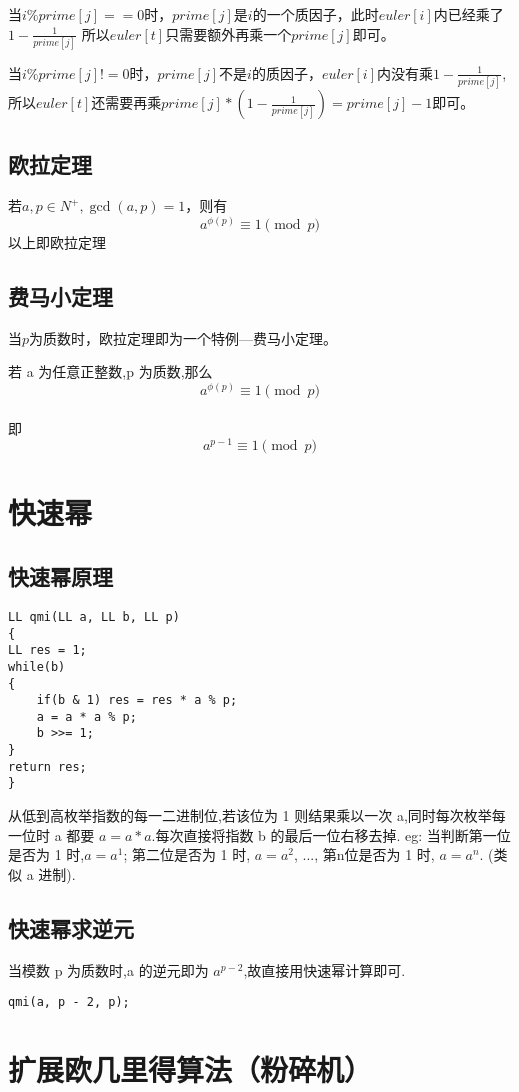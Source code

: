 \documentclass[]{book}
\begin{document}
当$i\%prime[j]==0$时，$prime[j]$是$i$的一个质因子，此时$euler[i]$内已经乘了$1-\frac{1}{prime[j]}$
所以$euler[t]$只需要额外再乘一个$prime[j]$即可。

当$i\%prime[j]!=0$时，$prime[j]$不是$i$的质因子，$euler[i]$内没有乘$1-\frac{1}{prime[j]}$,
所以$euler[t]$还需要再乘$prime[j]*(1-\frac{1}{prime[j]}) = prime[j] - 1$即可。

\section{欧拉定理}
若$a,p\in N ^+,\gcd(a, p) = 1$，则有
\[a^{\phi(p)}\equiv 1 \pmod{p}\]
以上即欧拉定理
\section{费马小定理}
当$p$为质数时，欧拉定理即为一个特例---费马小定理。

若 a 为任意正整数,p 为质数,那么
\[a^{\phi(p)}\equiv 1 \pmod{p}\]\\即
\[a^{p-1}\equiv 1 \pmod{p}\]
\chapter{快速幂}
\section{快速幂原理}
\begin{lstlisting}
LL qmi(LL a, LL b, LL p)
{
LL res = 1;
while(b)
{
    if(b & 1) res = res * a % p;
    a = a * a % p;
    b >>= 1;
}
return res;
}
\end{lstlisting}
从低到高枚举指数的每一二进制位,若该位为 1 则结果乘以一次 a,同时每次枚举每一位时 a 都要 $a = a * a$.每次直接将指数 b 的最后一位右移去掉.
eg: 当判断第一位是否为 1 时,$a = a^{1}$; 第二位是否为 1 时, $a = a^{2}$, ..., 第n位是否为 1 时, $a = a^{n}$. (类似 a 进制).

\section{快速幂求逆元}
当模数 p 为质数时,a 的逆元即为 $a^{p-2}$,故直接用快速幂计算即可.
\begin{lstlisting}
qmi(a, p - 2, p);
\end{lstlisting}

\chapter{扩展欧几里得算法（粉碎机）}
\end{document}
